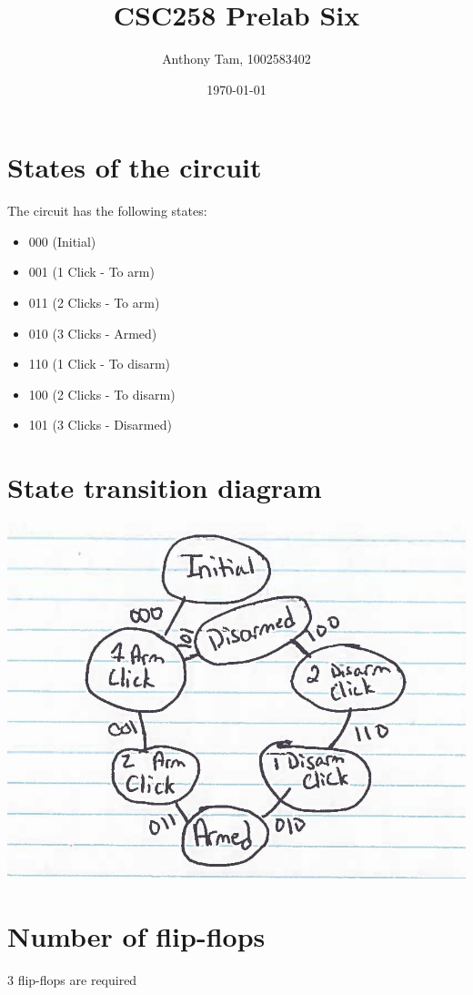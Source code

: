 \documentclass[11pt]{article}
\author{Anthony Tam, 1002583402}
\date{\today}
\title{CSC258 Prelab Six}
\begin{document}
\maketitle


\section{States of the circuit}
\label{sec-1}
The circuit has the following states:
\begin{itemize}
\item 000 (Initial)
\item 001 (1 Click - To arm)
\item 011 (2 Clicks - To arm)
\item 010 (3 Clicks - Armed)
\item 110 (1 Click - To disarm)
\item 100 (2 Clicks - To disarm)
\item 101 (3 Clicks - Disarmed)
\end{itemize}

\section{State transition diagram}
\label{sec-2}
\includegraphics[width=\textwidth]{ST-1.jpg}

\section{Number of flip-flops}
\label{sec-3}
3 flip-flops are required
\end{document}
